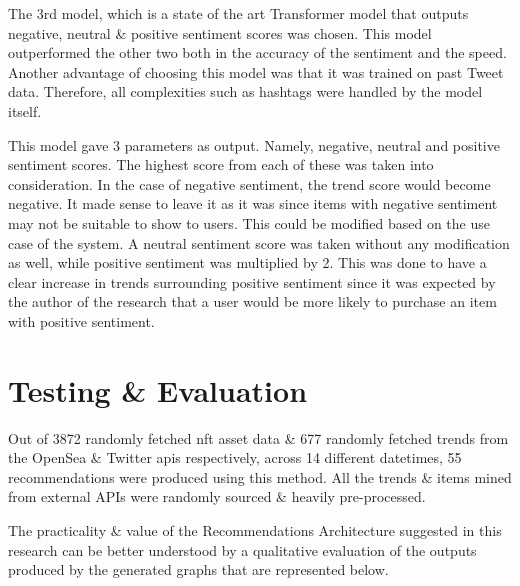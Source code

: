\documentclass[manuscript,natbib=false, anonymous]{acmart}
\begin{document}
The 3rd model, which is a state of the art Transformer model \cite{CardiffnlpTwitterrobertabasesentimentHugging, wolfTransformersStateoftheArtNatural2020} that outputs negative, neutral \& positive sentiment scores was chosen. This model outperformed the other two both in the accuracy of the sentiment and the speed. Another advantage of choosing this model was that it was trained on past Tweet data. Therefore, all complexities such as hashtags were handled by the model itself.

This model gave 3 parameters as output. Namely, negative, neutral and positive sentiment scores. The highest score from each of these was taken into consideration.
In the case of negative sentiment, the trend score would become negative. It made sense to leave it as it was since items with negative sentiment may not be suitable to show to users. This could be modified based on the use case of the system.
A neutral sentiment score was taken without any modification as well, while positive sentiment was multiplied by 2. This was done to have a clear increase in trends surrounding positive sentiment since it was expected by the author of the research that a user would be more likely to purchase an item with positive sentiment.

\section{Testing \& Evaluation}

Out of 3872 randomly fetched \gls{nft} asset data \& 677 randomly fetched trends from the OpenSea \& Twitter \gls{api}s respectively, across 14 different datetimes, 55 recommendations were produced using this method. All the trends \& items mined from external APIs were randomly sourced \& heavily pre-processed.

The practicality \& value of the Recommendations Architecture suggested in this research can be better understood by a qualitative evaluation of the outputs produced by the generated graphs that are represented below.
\end{document}

